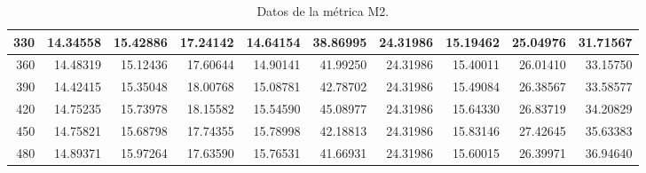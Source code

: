 \begin{table}[h]
\begin{tabular}{|r|r|r|r|r|r|r|r|r|r|}
			\hline \tiny 330 &{\tiny 14.34558}&{\tiny 15.42886}&{\tiny 17.24142}&{\tiny 14.64154}&{\tiny 38.86995}&{\tiny 24.31986}&{\tiny 15.19462}&{\tiny 25.04976} &{\tiny 31.71567} \\											
			\hline \tiny 360 &{\tiny 14.48319}&{\tiny 15.12436}&{\tiny 17.60644}&{\tiny 14.90141}&{\tiny 41.99250}&{\tiny 24.31986}&{\tiny 15.40011}&{\tiny 26.01410} &{\tiny 33.15750} \\											
			\hline \tiny 390 &{\tiny 14.42415}&{\tiny 15.35048}&{\tiny 18.00768}&{\tiny 15.08781}&{\tiny 42.78702}&{\tiny 24.31986}&{\tiny 15.49084}&{\tiny 26.38567} &{\tiny 33.58577} \\											
			\hline \tiny 420 &{\tiny 14.75235}&{\tiny 15.73978}&{\tiny 18.15582}&{\tiny 15.54590}&{\tiny 45.08977}&{\tiny 24.31986}&{\tiny 15.64330}&{\tiny 26.83719} &{\tiny 34.20829} \\											
			\hline \tiny 450 &{\tiny 14.75821}&{\tiny 15.68798}&{\tiny 17.74355}&{\tiny 15.78998}&{\tiny 42.18813}&{\tiny 24.31986}&{\tiny 15.83146}&{\tiny 27.42645} &{\tiny 35.63383} \\											
			\hline \tiny 480 &{\tiny 14.89371}&{\tiny 15.97264}&{\tiny 17.63590}&{\tiny 15.76531}&{\tiny 41.66931}&{\tiny 24.31986}&{\tiny 15.60015}&{\tiny 26.39971} &{\tiny 36.94640} \\																	
			\hline								
		\end{tabular}	 	
		\caption{Datos de la m\'etrica M2.}
   \label{tabA2}	
\end{table}


